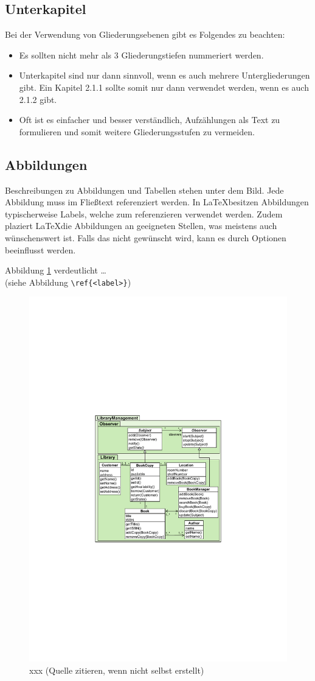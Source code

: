 \subsection{Unterkapitel}

Bei der Verwendung von Gliederungsebenen gibt es Folgendes zu beachten:
\begin{itemize}
	\item Es sollten nicht mehr als 3 Gliederungstiefen nummeriert werden.
	\item Unterkapitel sind nur dann sinnvoll, wenn es auch mehrere Untergliederungen gibt. Ein Kapitel 2.1.1 sollte somit nur dann verwendet werden, wenn es auch 2.1.2 gibt.
	\item Oft ist es einfacher und besser verständlich, Aufzählungen als Text zu formulieren und somit weitere Gliederungsstufen zu vermeiden.
\end{itemize}

\subsection{Abbildungen}
\label{sec:abbildungen}

Beschreibungen zu Abbildungen und Tabellen stehen unter dem Bild. Jede Abbildung muss im Fließtext referenziert werden. In \LaTeX besitzen Abbildungen typischerweise Labels, welche zum referenzieren verwendet werden. Zudem plaziert \LaTeX die Abbildungen an geeigneten Stellen, was meistens auch wünschenswert ist. Falls das nicht gewünscht wird, kann es durch Optionen beeinflusst werden.

Abbildung \ref{fig:xxx} verdeutlicht  \dots\\
(siehe Abbildung \verb|\ref{<label>}|)

\begin{figure}
	\centering
	\includegraphics[width=0.4\linewidth]{figures/figure1}
	\caption{xxx (Quelle zitieren, wenn nicht selbst erstellt)}
	\label{fig:xxx}
\end{figure}

